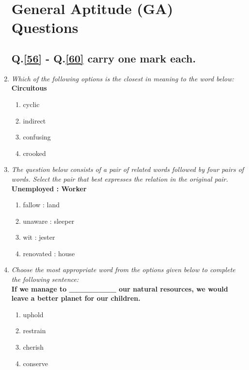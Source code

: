 \documentclass[journal]{IEEEtran}
\begin{document}
\begin{enumerate}
        \section*{General Aptitude (GA) Questions}
        \subsection*{Q.\ref{56} - Q.\ref{60} carry one mark each.}

        \item \textit{Which of the following options is the closest in meaning to the word below:} \\ \textbf{Circuitous}
            \begin{enumerate}
                \item cyclic
                \item indirect
                \item confusing
                \item crooked
            \end{enumerate}

            \item \textit{The question below consists of a pair of related words followed by four pairs of words. Select the pair that best expresses the relation in the original pair.} \\
            \textbf{Unemployed : Worker}
            \begin{enumerate}
                \item fallow : land
                \item unaware : sleeper
                \item wit : jester
                \item renovated : house
            \end{enumerate}
    
            \item \textit{Choose the most appropriate word from the options given below to complete the following sentence:} \\
            \textbf{If we manage to \_\_\_\_\_\_\_\_ our natural resources, we would leave a better planet for our children.}
            \begin{enumerate}
                \item uphold
                \item restrain
                \item cherish
                \item conserve
            \end{enumerate}


\end{enumerate}
\end{document}
